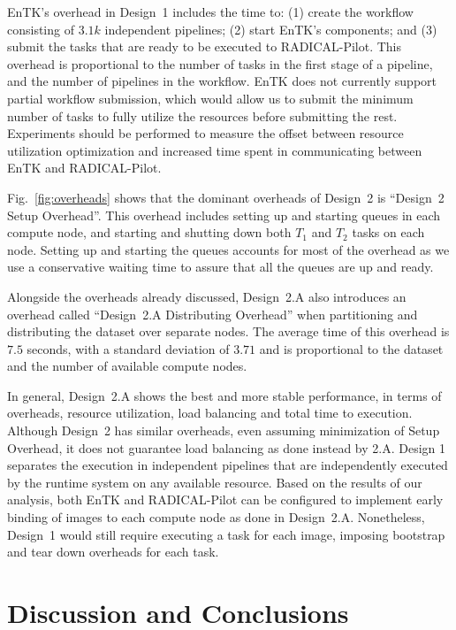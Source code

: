 EnTK's overhead in Design~1 includes the time to: (1) create the workflow consisting of $3.1k$ independent pipelines; (2) start EnTK's components; and (3) submit the tasks that are ready to be executed to RADICAL-Pilot. 
This overhead is proportional to the number of tasks in the first stage of a pipeline, and the number of pipelines in the workflow.
EnTK does not currently support partial workflow submission, which would allow us to submit the minimum number of tasks to fully utilize the resources before submitting the rest.
Experiments should be performed to measure the offset between resource utilization optimization and increased time spent in communicating between EnTK and RADICAL-Pilot.

Fig.~\ref{fig:overheads} shows that the dominant overheads of Design~2 is ``Design~2 Setup Overhead''.
This overhead includes setting up and starting queues in each compute node, and starting and shutting down both $T_{1}$ and $T_{2}$ tasks on each node.
Setting up and starting the queues accounts for most of the overhead as we use a conservative waiting time to assure that all the queues are up and ready.

Alongside the overheads already discussed, Design~2.A also introduces an overhead called ``Design~2.A Distributing Overhead'' when partitioning and distributing the dataset over separate nodes.
The average time of this overhead is $7.5$ seconds, with a standard deviation of $3.71$ and is proportional to the dataset and the number of available compute nodes.

In general, Design~2.A shows the best and more stable performance, in terms of overheads, resource utilization, load balancing and total time to execution.
Although Design~2 has similar overheads, even assuming minimization of Setup Overhead, it does not guarantee load balancing as done instead by 2.A.
Design 1 separates the execution in independent pipelines that are independently executed by the runtime system on any available resource.
Based on the results of our analysis, both EnTK and RADICAL-Pilot can be configured to implement early binding of images to each compute node as done in Design~2.A.
Nonetheless, Design~1 would still require executing a task for each image, imposing bootstrap and tear down overheads for each task.

\section{Discussion and Conclusions}
\label{sec:des_concl}

